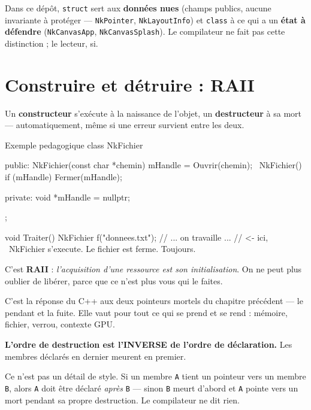 \begin{nkretenir}
Dans ce dépôt, \texttt{struct} sert aux \textbf{données nues} (champs publics,
aucune invariante à protéger --- \texttt{NkPointer}, \texttt{NkLayoutInfo}) et
\texttt{class} à ce qui a un \textbf{état à défendre} (\texttt{NkCanvasApp},
\texttt{NkCanvasSplash}). Le compilateur ne fait pas cette distinction ; le
lecteur, si.
\end{nkretenir}

\section{Construire et détruire : RAII}

Un \textbf{constructeur} s'exécute à la naissance de l'objet, un
\textbf{destructeur} à sa mort --- automatiquement, même si une erreur survient
entre les deux.

\begin{nkcode}{Exemple pedagogique}
class NkFichier {
    public:
        NkFichier(const char *chemin) { mHandle = Ouvrir(chemin); }
        ~NkFichier()                  { if (mHandle) { Fermer(mHandle); } }

    private:
        void *mHandle = nullptr;
};

void Traiter() {
    NkFichier f("donnees.txt");
    // ... on travaille ...
}   // <- ici, ~NkFichier s'execute. Le fichier est ferme. Toujours.
\end{nkcode}

\begin{nkretenir}
C'est \textbf{RAII} : \emph{l'acquisition d'une ressource est son
initialisation}. On ne peut plus oublier de libérer, parce que ce n'est plus
vous qui le faites.

C'est la réponse du C++ aux deux pointeurs mortels du chapitre précédent --- le
pendant et la fuite. Elle vaut pour tout ce qui se prend et se rend : mémoire,
fichier, verrou, contexte GPU.
\end{nkretenir}

\begin{nkpiege}
\textbf{L'ordre de destruction est l'INVERSE de l'ordre de déclaration.} Les
membres déclarés en dernier meurent en premier.

Ce n'est pas un détail de style. Si un membre \texttt{A} tient un pointeur vers
un membre \texttt{B}, alors \texttt{A} doit être déclaré \emph{après} \texttt{B}
--- sinon \texttt{B} meurt d'abord et \texttt{A} pointe vers un mort pendant sa
propre destruction. Le compilateur ne dit rien.
\end{nkpiege}

